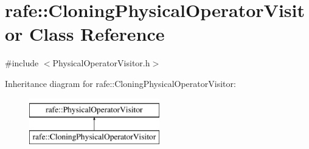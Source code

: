 \hypertarget{classrafe_1_1_cloning_physical_operator_visitor}{\section{rafe\+:\+:Cloning\+Physical\+Operator\+Visitor Class Reference}
\label{classrafe_1_1_cloning_physical_operator_visitor}
}


{\ttfamily \#include $<$Physical\+Operator\+Visitor.\+h$>$}

Inheritance diagram for rafe\+:\+:Cloning\+Physical\+Operator\+Visitor\+:\begin{figure}[H]
\begin{center}
\leavevmode
\includegraphics[height=2.000000cm]{classrafe_1_1_cloning_physical_operator_visitor}
\end{center}
\end{figure}
